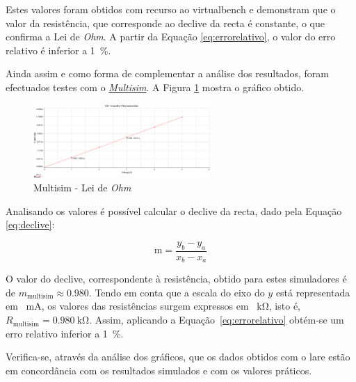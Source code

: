 Estes valores foram obtidos com recurso ao \acrshort{virtualbench} e demonstram que o valor da resistência, que corresponde ao declive da recta é constante, o que confirma a Lei de \textit{Ohm}. A partir da Equação \ref{eq:errorelativo}, o valor do erro relativo é inferior a \SI{1}{\percent}. 

Ainda assim e como forma de complementar a análise dos resultados, foram efectuados testes com o \href{https://www.multisim.com}{\textit{Multisim}}. A Figura \ref{fig:multisimOHM} mostra o gráfico obtido.

\begin{figure}[hbtp]
	\centering
	\includegraphics[width=0.6\textwidth]{figures/OHM_resultado_multisim.png}
	\caption{Multisim - Lei de \textit{Ohm}}
	\label{fig:multisimOHM}
\end{figure}

Analisando os valores é possível calcular o declive da recta, dado pela Equação \ref{eq:declive}:

\begin{equation} \label{eq:declive}
	\text{m} = \frac{y_{b} - y_{a}}{x_{b} - x_{a}}
\end{equation}

O valor do declive, correspondente à resistência, obtido para estes simuladores é de $m_\text{{multisim}} \approx{0.980}$. Tendo em conta que a escala do eixo do $y$ está representada em \SI{}{\milli\ampere}, os valores das resistências surgem expressos em \SI{}{\kilo\ohm}, isto é, $R_\text{{multisim}} = \SI{0.980}{\kilo\ohm}$. Assim, aplicando a Equação~\ref{eq:errorelativo} obtém-se um erro relativo inferior a \SI{1}{\percent}.

Verifica-se, através da análise dos gráficos, que os dados obtidos com o \acrshort{lare} estão em concordância com os resultados simulados e com os valores práticos.

